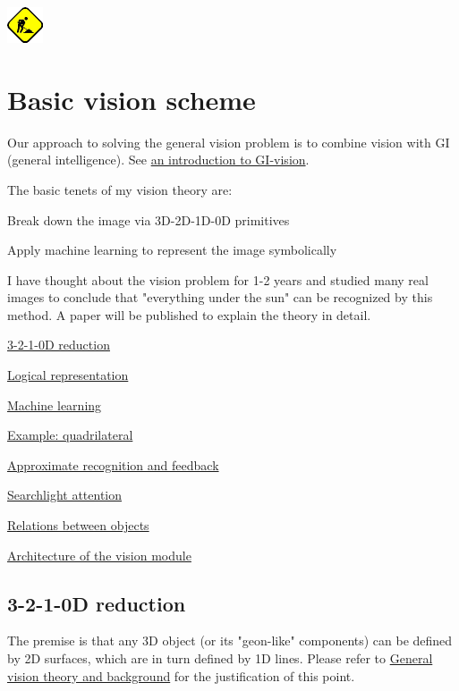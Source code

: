 \includegraphics[bb=0 0 40 40]{UnderConst.png}

\section{Basic vision scheme}

Our approach to solving the general vision problem is to combine vision with GI (general intelligence). See \href{Vis-Cognition.htm}{an introduction to GI-vision}.

The basic tenets of my vision theory are:
\begin{compactenum}
	\item  Break down the image via 3D-2D-1D-0D primitives
	\item  Apply  machine learning to represent the image symbolically
\end{compactenum}

I have thought about the vision problem for 1-2 years and studied many real images to conclude that "everything under the sun" can be recognized by this method. A  paper will be published to explain the theory in detail.
\underconst
\begin{compactenum}
	\item \hyperlink{3210DReduction}{3-2-1-0D reduction}
	\item \hyperlink{LogicalRepresentation}{Logical representation}
	\item \hyperlink{MachineLearning}{Machine learning}
	\item \hyperlink{Example}{Example: quadrilateral}
	\item \hyperlink{ApproximateRecognition}{Approximate recognition and feedback}
	\item \hyperlink{Attention}{Searchlight attention}
	\item \hyperlink{Relations}{Relations between objects}
	\item \hyperlink{Architecture}{Architecture of the vision module}
\end{compactenum}

\subsection{3-2-1-0D reduction}

The premise is that any 3D object (or its "geon-like" components) can be defined by  2D surfaces, which are in turn defined by 1D lines. Please refer to \href{Vis-Background.htm}{General vision theory and background} for the justification of this point.

